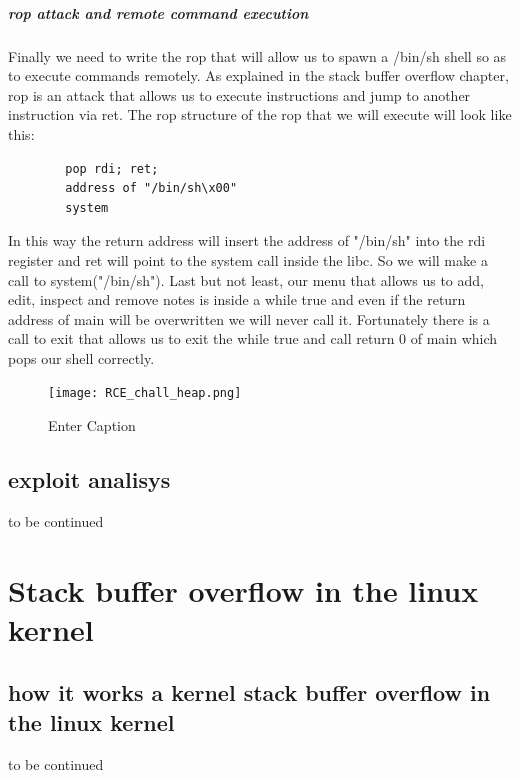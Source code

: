 \documentclass{report}
\begin{document}
    \paragraph{rop attack and remote command execution}
    Finally we need to write the rop that will allow us to spawn a /bin/sh shell so as to execute commands remotely.\newline
    As explained in the stack buffer overflow chapter, rop is an attack that allows us to execute instructions and jump to another instruction via ret.\newline
    The rop structure of the rop that we will execute will look like this:
    \begin{verbatim}
        pop rdi; ret;
        address of "/bin/sh\x00"
        system 
    \end{verbatim}
    In this way the return address will insert the address of "/bin/sh" into the rdi register and ret will point to the system call inside the libc.\newline
    So we will make a call to system("/bin/sh").\newline
    Last but not least, our menu that allows us to add, edit, inspect and remove notes is inside a while true and even if the return address of main will be overwritten we will never call it.\newline
    Fortunately there is a call to exit that allows us to exit the while true and call return 0 of main which pops our shell correctly.\newline
    \begin{figure}[htbp]
        \centering
        \texttt{[image: RCE\_chall\_heap.png]}
        \caption{Enter Caption}
        \label{fig:enter-label}
    \end{figure}
    \clearpage
    \section{exploit analisys}
    to be continued
    \clearpage
    \chapter{Stack buffer overflow in the linux kernel}
    \section{how it works a kernel stack buffer overflow in the linux kernel}
    to be continued    
    \clearpage
\end{document}

